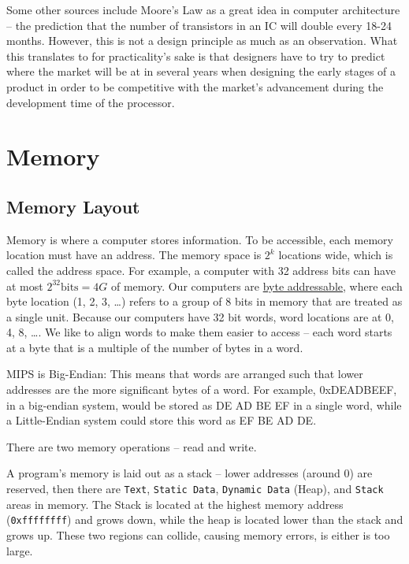 \documentclass{article}
\begin{document}
Some other sources include Moore's Law as a great idea in computer architecture -- the prediction that the number of transistors in an IC will double every 18-24 months. However, this is not a design principle as much as an observation. What this translates to for practicality's sake is that designers have to try to predict where the market will be at in several years when designing the early stages of a product in order to be competitive with the market's advancement during the development time of the processor. 


\section{Memory}

\subsection{Memory Layout}

Memory is where a computer stores information. To be accessible, each memory location must have an address. The memory space is $2^k$ locations wide, which is called the address space. For example, a computer with 32 address bits can have at most $2^{32} \text{bits} = 4G$ of memory. Our computers are \underline{byte addressable}, where each byte location (1, 2, 3, \ldots) refers to a group of 8 bits in memory that are treated as a single unit. Because our computers have 32 bit words, word locations are at 0, 4, 8, \ldots. We like to align words to make them easier to access -- each word starts at a byte that is a multiple of the number of bytes in a word.

MIPS is Big-Endian: This means that words are arranged such that lower addresses are the more significant bytes of a word. For example, 0xDEADBEEF, in a big-endian system, would be stored as DE AD BE EF in a single word, while a Little-Endian system could store this word as EF BE AD DE.

There are two memory operations -- read and write. 

A program's memory is laid out as a stack -- lower addresses (around 0) are reserved, then there are \texttt{Text}, \texttt{Static Data}, \texttt{Dynamic Data} (Heap), and \texttt{Stack} areas in memory. The Stack is located at the highest memory address (\texttt{0xffffffff}) and grows down, while the heap is located lower than the stack and grows up. These two regions can collide, causing memory errors, is either is too large. 
\end{document}
